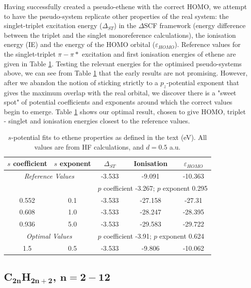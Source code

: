 \documentclass[journal=jctcce,manuscript=article]{achemso}
\begin{document}
Having successfully created a pseudo-ethene with the correct HOMO, we attempt to have the pseudo-system replicate other properties of the real system:
the singlet-triplet excitation energy ($\Delta_{ST}$) in the $\Delta$SCF framework (energy difference between the triplet and the singlet monoreference
calculations), the ionisation energy (IE) and the energy of the HOMO orbital ($\varepsilon_{HOMO}$). Reference values for the singlet-triplet \(\pi-\pi*\) excitation and first ionisation energies of ethene are given in Table \ref{table:ethene_excitations}. Testing the relevant energies for the optimised pseudo-systems above, we can see from Table \ref{table:ethene_excitations} that the early results are not promising. However, after we abandon the notion of sticking strictly to a \(p_{z}\)-potential exponent that gives the maximum overlap with the real orbital, we discover there is a "sweet spot" of potential coefficients and exponents around which the correct values begin to emerge. Table \ref{table:ethene_excitations} shows our optimal result, chosen to give HOMO, triplet - singlet and ionisation energies closest to the reference values. 

\begin{table}[ht]
\caption{\(s\)-potential fits to ethene properties as defined in the text (eV). All values are from HF calculations, and \(d = 0.5\) a.u.}
\begin{tabular}{c c c c c}
\hline
\(s\) coefficient & \(s\) exponent & $\Delta_{ST}$  & Ionisation  & $\varepsilon_{HOMO}$  \\
\hline
\multicolumn{2}{c}{\textit{Reference Values}} & -3.533 & -9.091 & -10.363 \\
\hline
&& \multicolumn{3}{l}{\(p\) coefficient -3.267; \(p\) exponent 0.295} \\
\hline
0.552 & 0.1 & -3.533 & -27.158 & -27.31 \\
0.608 & 1.0 & -3.533 & -28.247 & -28.395 \\
0.936 & 5.0 & -3.533 & -29.583 & -29.722 \\
\hline
\multicolumn{2}{c}{\textit{Optimal Values}} &\multicolumn{3}{l}{\(p\) coefficient -3.91; \(p\) exponent 0.624} \\
\hline
1.5 & 0.5 & -3.533 & -9.806 & -10.062 \\
\hline
\end{tabular}
\label{table:ethene_excitations}
\end{table}

\subsection{C\(\mathbf{_{2n}}\)H\(\mathbf{_{2n+2}}\), \(\mathbf{n=2-12}\)}
\end{document}
